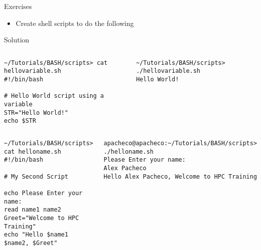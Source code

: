 \documentclass[slidestop,mathserif,compress,xcolor=svgnames]{beamer}
\newenvironment{eblock}[0]
{
\begin{beamerboxesrounded}[upper=uppercol2,lower=lowercol2,shadow=true]}
{\end{beamerboxesrounded}}
\begin{document}
\begin{frame}{\small Exercises}
  \begin{itemize}
    \item Create shell scripts to do the following
  \end{itemize}
\end{frame}

\begin{frame}[fragile]{\small Solution}
  \begin{columns}
    \begin{eblock}{}
      {\fontsize{4.5}{5.5}\selectfont
        \begin{verbatim}
~/Tutorials/BASH/scripts> cat hellovariable.sh
#!/bin/bash

# Hello World script using a variable
STR="Hello World!"
echo $STR
        \end{verbatim}
      }
    \end{eblock}
    \begin{eblock}{}
      {\fontsize{4.5}{5.5}\selectfont
        \begin{verbatim}
~/Tutorials/BASH/scripts> ./hellovariable.sh 
Hello World!
        \end{verbatim}
      }
    \end{eblock}
  \end{columns}
  \begin{columns}
    \begin{eblock}{}
      {\fontsize{4.5}{5.5}\selectfont
        \begin{verbatim}
~/Tutorials/BASH/scripts> cat helloname.sh
#!/bin/bash

# My Second Script

echo Please Enter your name:
read name1 name2
Greet="Welcome to HPC Training"
echo "Hello $name1 $name2, $Greet"
        \end{verbatim}
      }
    \end{eblock}
    \begin{eblock}{}
      {\fontsize{4.5}{5.5}\selectfont
        \begin{verbatim}
apacheco@apacheco:~/Tutorials/BASH/scripts> ./helloname.sh 
Please Enter your name:
Alex Pacheco
Hello Alex Pacheco, Welcome to HPC Training
        \end{verbatim}
      }
    \end{eblock}
  \end{columns}
\end{frame}
\end{document}

